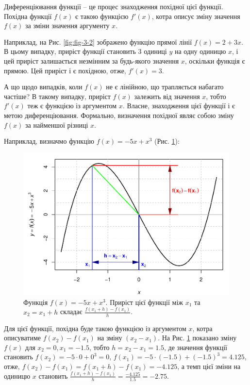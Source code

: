\documentclass[
  11pt,
]{book}
\begin{document}
Диференціювання функції -- це процес знаходження похідної цієї функції. Похідна функції \(f(x)\) є такою функцією \(f'(x)\), котра описує зміну значення \(f(x)\) за зміни значення аргументу \(x\).

Наприклад, на Рис. \ref{fig:fig-3-2} зображено функцію прямої лінії \(f(x) = 2 + 3x\). В цьому випадку, приріст функції становить 3 одиниці \(y\) на одну одиницю \(x\), і цей приріст залишається незмінним за будь-якого значення \(x\), оскільки функція є прямою. Цей приріст і є похідною, отже, \(f'(x) = 3\).

А що щодо випадків, коли \(f(x)\) не є лінійною, що трапляється набагато частіше? В такому випадку, приріст \(f(x)\) залежить від значення \(x\), тобто \(f'(x)\) теж є функцією із аргументом \(x\). Власне, знаходження цієї функції і є метою диференціювання. Формально, визначення похідної являє собою зміну \(f(x)\) за найменшої різниці \(x\).

Наприклад, визначмо функцію \(f(x) = -5x + x^3\) (Рис. \ref{fig:fig-3-4}):

\begin{figure}
\centering
\includegraphics{bookdown-demo_files/figure-latex/fig-3-4-1.pdf}
\caption{\label{fig:fig-3-4}Функція \(f(x) = -5x + x^3\). Приріст цієї функції між \(x_1\) та \(x_2 = x_1 + h\) складає \(\frac{f(x_1 + h) - f(x_1)}{h}\).}
\end{figure}

Для цієї функції, похідна буде такою функцією із аргументом \(x\), котра описуватиме \(f(x_2) - f(x_1)\) на зміну \((x_2 - x_1)\). На Рис. \ref{fig:fig-3-4} показано зміну \(f(x)\) для \(x_2 = 0, x_1 = -1.5\), тобто \(h = x_2 - x_1 = 1.5\), де значення функції становить \(f(x_2) = -5 \cdot 0 + 0^3 = 0\), \(f(x_1) = -5 \cdot (-1.5) + (-1.5)^3 = 4.125\), отже, \(f(x_2) - f(x_1) = f(x_1+h) - f(x_1) = -4.125\), а темп цієї зміни на одиницю \(x\) становить \(\frac{f(x_1 + h) - f(x_1)}{h} = \frac{-4.125}{1.5} = -2.75\).
\end{document}
